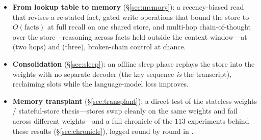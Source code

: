 \begin{itemize}
fact-count cliff at a single read/write site. Read-early/write-late is in turn
improved on: reading \emph{and} writing at every layer of the one shared store,
each layer storing its own value keyed by the exact token, lifts cold recall
$\to$/ (two seeds), with a residual-key
control at chance isolating the cause as per-depth values, not slot capacity.
\item \textbf{From lookup table to memory} (\S\ref{sec:memory}): a recency-biased
read that revises a re-stated fact, gated write operations that bound the store to
$O(\text{facts})$ at full recall on one shared store, and multi-hop
chain-of-thought over the store---reasoning across facts held outside the context
window---at  (two hops) and  (three), broken-chain control at
chance.
\item \textbf{Consolidation} (\S\ref{sec:sleep}): an offline sleep phase replays
the store into the weights with no separate decoder (the key sequence \emph{is} the
transcript), reclaiming slots while the language-model loss improves.
\item \textbf{Memory transplant} (\S\ref{sec:transplant}): a direct test of the
stateless-weights / stateful-store thesis---stores swap cleanly on the same weights
and fail across different weights---and a full chronicle of the $113$
experiments behind these results (\S\ref{sec:chronicle}), logged round by round in
.
\end{itemize}
